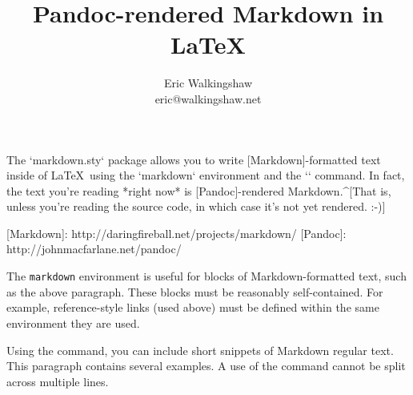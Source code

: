 \documentclass{article}
\begin{document}
\title{Pandoc-rendered Markdown in \LaTeX}
\author{Eric Walkingshaw \\ \small eric@walkingshaw.net}
\date{}
\maketitle

\begin{markdown}
The `markdown.sty` package allows you to write [Markdown]-formatted text inside
of \LaTeX\ using the `markdown` environment and the `\markd` command. In fact,
the text you're reading *right now* is [Pandoc]-rendered Markdown.^[That is,
unless you're reading the source code, in which case it's not yet rendered. :-)] 

[Markdown]: http://daringfireball.net/projects/markdown/
[Pandoc]: http://johnmacfarlane.net/pandoc/
\end{markdown}

The \texttt{markdown} environment is useful for blocks of Markdown-formatted
text, such as the above paragraph. These blocks must be reasonably
self-contained. For example, reference-style links (used above) must be defined
within the same environment they are used.

Using the  command, you can include short snippets of Markdown
 regular text. This paragraph contains several examples. A use
of the  command cannot be split across multiple
lines.

\end{document}
